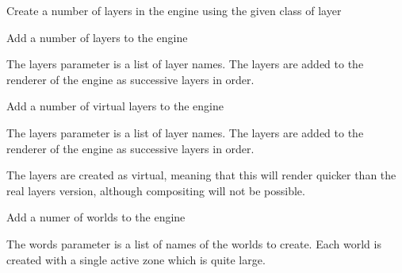 \documentclass[letterpaper,10pt,english]{sphinxmanual}
\begin{document}

\begin{fulllineitems}
\label{blocks:serge.blocks.utils.createLayers}
Create a number of layers in the engine using the given class of layer

\end{fulllineitems}


\begin{fulllineitems}
\label{blocks:serge.blocks.utils.createLayersForEngine}
Add a number of layers to the engine

The layers parameter is a list of layer names. The layers are added to
the renderer of the engine as successive layers in order.

\end{fulllineitems}


\begin{fulllineitems}
\label{blocks:serge.blocks.utils.createVirtualLayersForEngine}
Add a number of virtual layers to the engine

The layers parameter is a list of layer names. The layers are added to
the renderer of the engine as successive layers in order.

The layers are created as virtual, meaning that this will render
quicker than the real layers version, although compositing
will not be possible.

\end{fulllineitems}


\begin{fulllineitems}
\label{blocks:serge.blocks.utils.createWorldsForEngine}
Add a numer of worlds to the engine

The words parameter is a list of names of the worlds to create.
Each world is created with a single active zone which is quite
large.

\end{fulllineitems}
\end{document}
